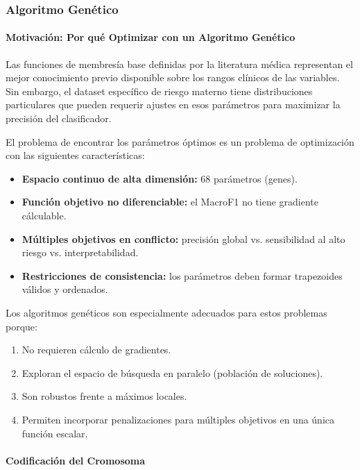 \documentclass[11pt]{article}
\begin{document}
\subsubsection{Algoritmo Genético}

\paragraph{Motivación: Por qué Optimizar con un Algoritmo Genético}
\label{sec:ag_motivacion}

Las funciones de membres\'ia base definidas por la literatura m\'edica representan el mejor conocimiento previo disponible sobre los rangos cl\'inicos de las variables. Sin embargo, el dataset espec\'ifico de riesgo materno tiene distribuciones particulares que pueden requerir ajustes en esos par\'ametros para maximizar la precisi\'on del clasificador.

El problema de encontrar los par\'ametros \'optimos es un problema de optimizaci\'on con las siguientes caracter\'isticas:
\begin{itemize}
    \item \textbf{Espacio continuo de alta dimensi\'on:} 68 par\'ametros (genes).
    \item \textbf{Funci\'on objetivo no diferenciable:} el MacroF1 no tiene gradiente c\'alculable.
    \item \textbf{M\'ultiples objetivos en conflicto:} precisi\'on global vs. sensibilidad al alto riesgo vs. interpretabilidad.
    \item \textbf{Restricciones de consistencia:} los par\'ametros deben formar trapezoides v\'alidos y ordenados.
\end{itemize}

Los algoritmos gen\'eticos son especialmente adecuados para estos problemas porque:
\begin{enumerate}
    \item No requieren c\'alculo de gradientes.
    \item Exploran el espacio de b\'usqueda en paralelo (poblaci\'on de soluciones).
    \item Son robustos frente a m\'aximos locales.
    \item Permiten incorporar penalizaciones para m\'ultiples objetivos en una \'unica funci\'on escalar.
\end{enumerate}

\paragraph{Codificación del Cromosoma}
\end{document}
